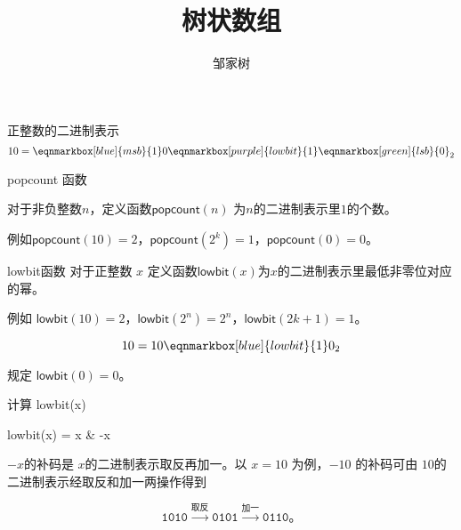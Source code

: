 \documentclass{ctexbeamer}
\title{树状数组}
\author{邹家树}
\newcommand{\lb}{\mathsf{lowbit}}
\newcommand{\popc}{\mathsf{popcount}}
\newcommand{\str}[1]{\texttt{#1}}
\newcommand{\xto}[1]{\xrightarrow{\text{#1}}}
\begin{document}
\maketitle

\begin{frame}{正整数的二进制表示}
\begin{equation*}
10 =
\eqnmarkbox[blue]{msb}{1}
0
\eqnmarkbox[purple]{lowbit}{1}
\eqnmarkbox[green]{lsb}{0}_2
\end{equation*}


\end{frame}


\begin{frame}{popcount 函数}

对于非负整数$n$，定义函数$\popc(n)$ 为$n$的二进制表示里$1$的个数。

例如$\popc(10) = 2$，$\popc(2^{k}) = 1$，$\popc(0) = 0$。

\end{frame}


\begin{frame}{lowbit函数}
对于正整数 $x$ 定义函数$\lb(x)$为$x$的二进制表示里最低非零位对应的幂。

\begin{block}{}
  例如 $\lb(10) = 2$，$\lb(2^{n}) = 2^{n}$，$\lb(2k+1) = 1$。
\end{block}

\begin{block}{}
  \begin{equation*}
  10 =
  1
  0
  \eqnmarkbox[blue]{lowbit}{1}
  0_2
  \end{equation*}
\end{block}

规定 $\lb(0) = 0$。
\end{frame}


\begin{frame}{计算 lowbit(x)}

\begin{tcolorbox}
  lowbit(x) = x \& -x
\end{tcolorbox}

$-x$的补码是 $x$的二进制表示取反再加一。以 $x = 10$ 为例，$-10$ 的补码可由 $10$的二进制表示经取反和加一两操作得到

\begin{equation*}
  \str{1010} \xto{取反} \str{0101} \xto{加一} \str{0110}。
\end{equation*}


\end{frame}
\end{document}
